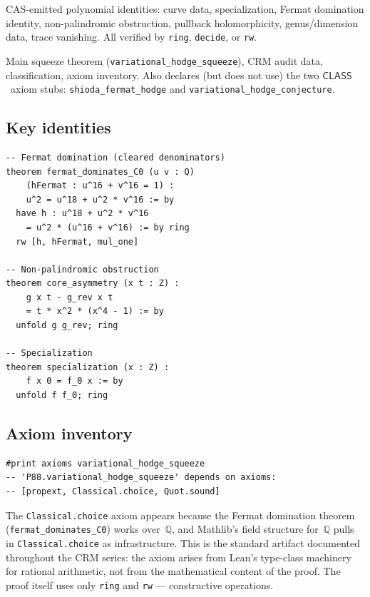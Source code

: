 \documentclass[11pt]{article}
\theoremstyle{plain}
\theoremstyle{definition}
\theoremstyle{remark}
\newcommand{\Q}{\mathbb{Q}}
\newcommand{\CLASS}{\ensuremath{\mathsf{CLASS}}}
\begin{document}
\begin{description}[leftmargin=2cm]
  \item[\texttt{FermatData.lean}] CAS-emitted polynomial identities:
    curve data, specialization, Fermat domination identity,
    non-palindromic obstruction, pullback holomorphicity,
    genus/dimension data, trace vanishing.
    All verified by \texttt{ring}, \texttt{decide}, or \texttt{rw}.
  \item[\texttt{Paper88\_Variational.lean}] Main squeeze theorem
    (\texttt{variational\_hodge\_squeeze}), CRM audit data,
    classification, axiom inventory.  Also declares (but does not
    use) the two \CLASS\ axiom stubs: \texttt{shioda\_fermat\_hodge}
    and \texttt{variational\_hodge\_conjecture}.
\end{description}

\subsection{Key identities}

\begin{lstlisting}
-- Fermat domination (cleared denominators)
theorem fermat_dominates_C0 (u v : Q)
    (hFermat : u^16 + v^16 = 1) :
    u^2 = u^18 + u^2 * v^16 := by
  have h : u^18 + u^2 * v^16
    = u^2 * (u^16 + v^16) := by ring
  rw [h, hFermat, mul_one]

-- Non-palindromic obstruction
theorem core_asymmetry (x t : Z) :
    g x t - g_rev x t
    = t * x^2 * (x^4 - 1) := by
  unfold g g_rev; ring

-- Specialization
theorem specialization (x : Z) :
    f x 0 = f_0 x := by
  unfold f f_0; ring
\end{lstlisting}

\subsection{Axiom inventory}

\begin{lstlisting}
#print axioms variational_hodge_squeeze
-- 'P88.variational_hodge_squeeze' depends on axioms:
-- [propext, Classical.choice, Quot.sound]
\end{lstlisting}

The \texttt{Classical.choice} axiom appears because the Fermat
domination theorem (\texttt{fermat\_dominates\_C0}) works over~$\Q$,
and Mathlib's field structure for~$\Q$ pulls in
\texttt{Classical.choice} as infrastructure.
This is the standard artifact documented throughout the CRM series:
the axiom arises from Lean's type-class machinery for rational
arithmetic, not from the mathematical content of the proof.
The proof itself uses only \texttt{ring} and \texttt{rw} ---
constructive operations.
\end{document}
